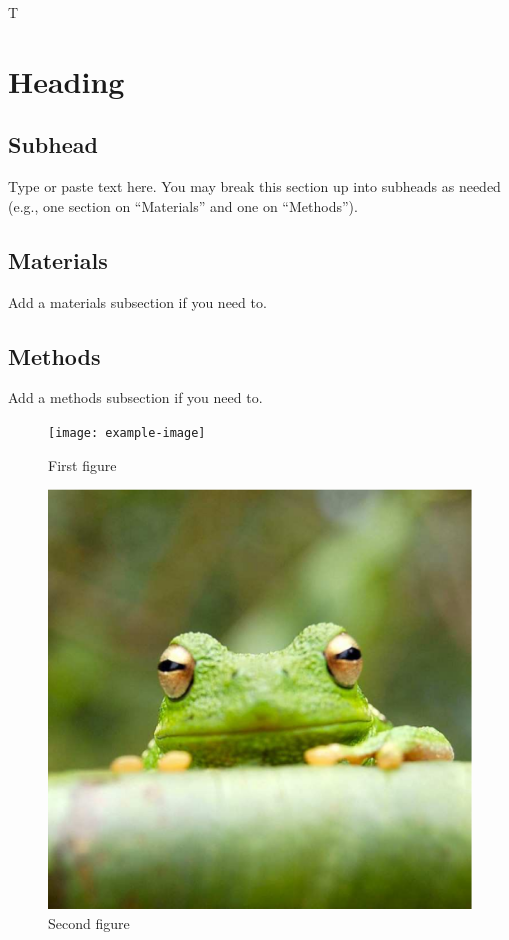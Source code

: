 \documentclass[9pt,twoside,lineno]{pnas-new}
\begin{document}
T

\section*{Heading}
\subsection*{Subhead}
Type or paste text here. You may break this section up into subheads as needed (e.g., one section on ``Materials'' and one on ``Methods'').

\subsection*{Materials}
Add a materials subsection if you need to.

\subsection*{Methods}
Add a methods subsection if you need to.


\begin{figure}
\centering
\texttt{[image: example-image]}
\caption{First figure}
\end{figure}

\begin{figure}
\centering
\includegraphics[width=\textwidth]{frog}
\caption{Second figure}
\end{figure}
\end{document}

